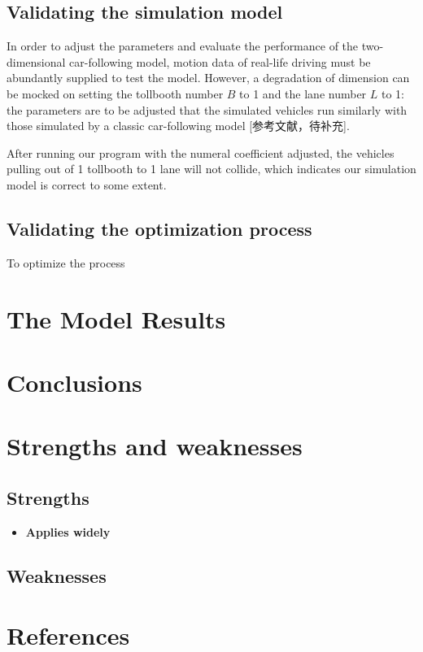 \documentclass{mcmthesis}
\begin{document}
\subsection{Validating the simulation model}

In order to adjust the parameters and evaluate the performance of the two-dimensional car-following model, motion data of real-life driving must be abundantly supplied to test the model. However, a degradation of dimension can be mocked on setting the tollbooth number $B$ to 1 and the lane number $L$ to 1: the parameters are to be adjusted that the simulated vehicles run similarly with those simulated by a classic car-following model [参考文献，待补充].

After running our program with the numeral coefficient adjusted, the vehicles pulling out of 1 tollbooth to 1 lane will not collide, which indicates our simulation model is correct to some extent.

\subsection{Validating the optimization process}

To optimize the process


\section{The Model Results}




\section{Conclusions}


\section{Strengths and weaknesses}


\subsection{Strengths}
\begin{itemize}
\item \textbf{Applies widely}\\


\end{itemize}
\subsection{Weaknesses}

\begin{appendices}



\end{appendices}


\section{References}
\nocite{*}



	
\end{document}
